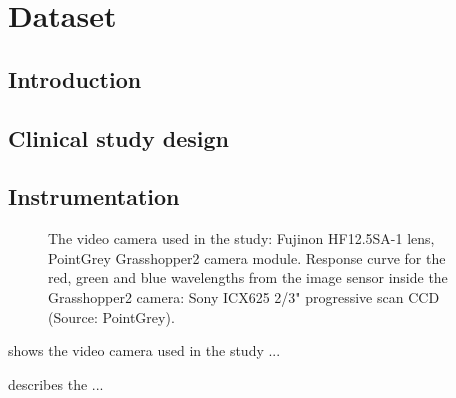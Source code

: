 \chapter{Dataset}
\label{chapter:dataset} 


\section{Introduction}

\lipsum[2-4]

\section{Clinical study design}

\lipsum[2-4]

\section{Instrumentation}

\lipsum[2-4]

\begin{figure}[tbh]
  \centering
  \caption[The PointGrey Grasshopper2 video camera]
  {
  The video camera used in the study:
     Fujinon HF12.5SA-1 lens,
   PointGrey Grasshopper2 camera module.
   Response curve for the red, green and blue wavelengths from the image sensor inside the Grasshopper2 camera: Sony ICX625 2/3" progressive scan CCD (Source: PointGrey).
  }
  \label{fig:grasshopper}
\end{figure}

 shows the video camera used in the study ...

\lipsum[2-4]

 describes the ...


